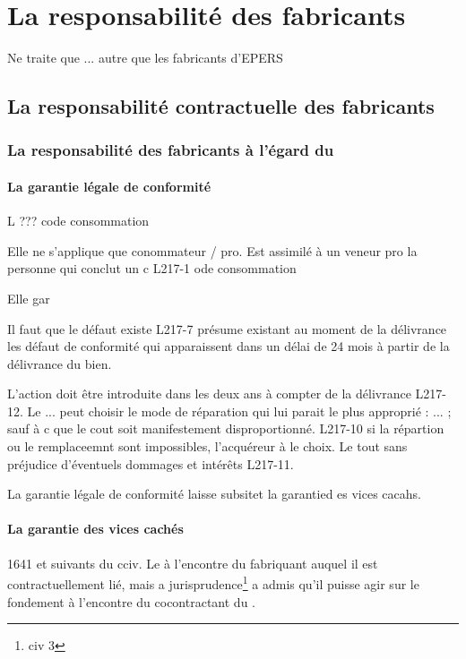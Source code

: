 
\chapter{La responsabilité des fabricants}

Ne traite que ... autre que les fabricants d'EPERS

\section{La responsabilité contractuelle des fabricants}

	\subsection{La responsabilité des fabricants à l'égard du \Mo}

		\subsubsection{La garantie légale de conformité}

			 L ??? code consommation

			Elle ne s'applique que conommateur / pro.  Est assimilé à un veneur pro la personne qui conclut un c L217-1 ode consommation

			Elle gar

			Il faut que le défaut existe L217-7 présume existant au moment de la délivrance les défaut de conformité qui apparaissent dans un délai de 24 mois à partir de la délivrance  du bien.

			L'action doit être introduite dans les deux ans à compter de la délivrance L217-12. Le ... peut choisir le mode de réparation qui lui parait le plus approprié : ... ; sauf à c que le cout soit manifestement disproportionné. L217-10 si la répartion ou le remplaceemnt sont impossibles, l'acquéreur à le choix. Le tout sans préjudice d'éventuels dommages et intérêts L217-11.

			La garantie légale de conformité laisse subsitet la garantied es vices cacahs.

		\subsubsection{La garantie des vices cachés}

			1641 et suivants du cciv. Le \Mo à l'encontre du fabriquant auquel il est contractuellement lié, mais a jurisprudence\footnote{civ 3} a admis qu'il puisse agir sur le fondement à l'encontre du cocontractant du \lo.


